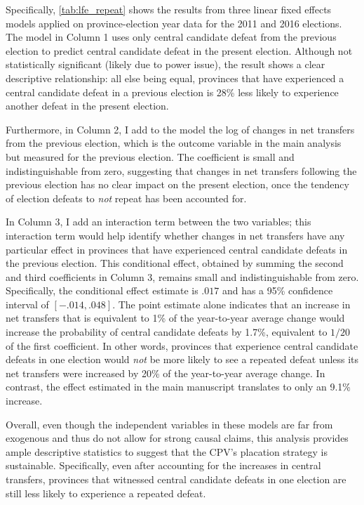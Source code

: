 \documentclass[12pt]{article}
\newcommand{\1}{\mathbbm{1}}
\begin{document}
Specifically, \autoref{tab:lfe_repeat} shows the results from three linear fixed effects models applied on province-election year data for the 2011 and 2016 elections. The model in Column 1 uses only central candidate defeat from the previous election to predict central candidate defeat in the present election. Although not statistically significant (likely due to power issue), the result shows a clear descriptive relationship: all else being equal, provinces that have experienced a central candidate defeat in a previous election is 28\% less likely to experience another defeat in the present election. 



Furthermore, in Column 2, I add to the model the log of changes in net transfers from the previous election, which is the outcome variable in the main analysis but measured for the previous election. The coefficient is small and indistinguishable from zero, suggesting that changes in net transfers following the previous election has no clear impact on the present election, once the tendency of election defeats to \textit{not} repeat has been accounted for. 

In Column 3, I add an interaction term between the two variables; this interaction term would help identify whether changes in net transfers have any particular effect in provinces that have experienced central candidate defeats in the previous election. This conditional effect, obtained by summing the second and third coefficients in Column 3, remains small and indistinguishable from zero. Specifically, the conditional effect estimate is $.017$ and has a 95\% confidence interval of $[-.014,.048]$. The point estimate alone indicates that an increase in net transfers that is equivalent to 1\% of the year-to-year average change would increase the probability of central candidate defeats by 1.7\%, equivalent to $1/20$ of the first coefficient. In other words, provinces that experience central candidate defeats in one election would \textit{not} be more likely to see a repeated defeat unless its net transfers were increased by 20\% of the year-to-year average change. In contrast, the effect estimated in the main manuscript translates to only an 9.1\% increase.

Overall, even though the independent variables in these models are far from exogenous and thus do not allow for strong causal claims, this analysis provides ample descriptive statistics to suggest that the CPV's placation strategy is sustainable. Specifically, even after accounting for the increases in central transfers, provinces that witnessed central candidate defeats in one election are still less likely to experience a repeated defeat.

\clearpage
{}
\printbibliography[heading=bibintoc]
\end{document}

